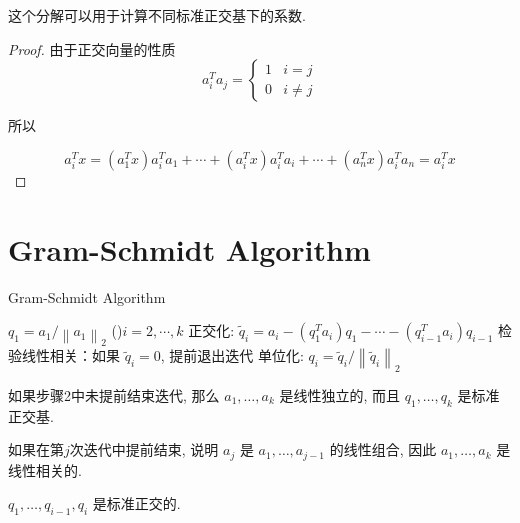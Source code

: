    这个分解可以用于计算不同标准正交基下的系数. 

\begin{proof}
    由于正交向量的性质
    $$ a_{i}^{T} a_{j}=\left\{\begin{array}{ll}1 & i=j \\ 0 & i \neq j\end{array}\right. $$

    所以

    $$ a_{i}^{T} x=\left(a_{1}^{T} x\right) a_{i}^{T} a_{1}+\cdots+\left(a_{i}^{T} x\right) a_{i}^{T} a_{i}+\cdots+\left(a_{n}^{T} x\right) a_{i}^{T} a_{n}=a_{i}^{T} x $$
\end{proof}

\section{Gram-Schmidt Algorithm}
\label{Chap:Gram-Schmidt Algorithm}
\begin{algorithm}[htbp]
    \caption{Gram-Schmidt Algorithm}
    $ q_{1}=a_{1} /\left\|a_{1}\right\|_{2} $\;
    \While(){$i=2,\cdots,k$}{
        正交化: $ \widetilde{q}_{i}=a_{i}-\left(q_{1}^{T} a_{i}\right) q_{1}-\cdots-\left(q_{i-1}^{T} a_{i}\right) q_{i-1} $\;
        检验线性相关：如果 $ \widetilde{q}_{i}=0 $, 提前退出迭代\;
        单位化: $ q_{i}=\widetilde{q}_{i} /\left\|\widetilde{q}_{i}\right\|_{2} $\;
    }
\end{algorithm}

如果步骤2中未提前结束迭代, 那么 $ a_{1}, \ldots, a_{k} $ 是线性独立的, 而且 $ q_{1}, \ldots, q_{k} $ 是标准正交基. 

如果在第$j$次迭代中提前结束, 说明 $ a_{j} $ 是 $ a_{1}, \ldots, a_{j-1} $ 的线性组合, 因此 $ a_{1}, \ldots, a_{k} $ 是线性相关的. 

\begin{theorem}
    \label{thm: qs-are-orthogonal}

    $q_{1}, \ldots, q_{i-1}, q_{i} $ 是标准正交的. 
\end{theorem}

